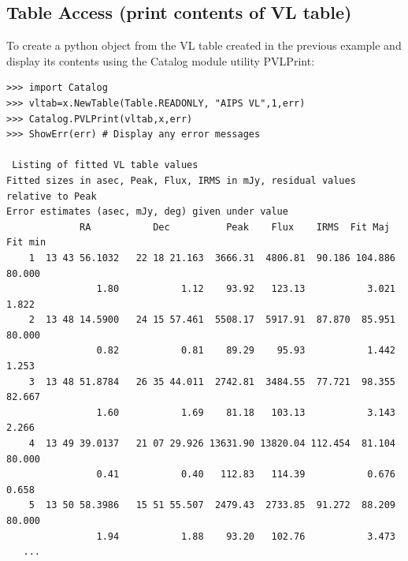 \documentclass[11pt]{report}
\begin{document}
\subsection{Table Access (print contents of VL table)}
To create a python object from the VL table created in the previous example
and display its contents using the Catalog module utility PVLPrint:
\begin{verbatim}
>>> import Catalog
>>> vltab=x.NewTable(Table.READONLY, "AIPS VL",1,err)
>>> Catalog.PVLPrint(vltab,x,err)
>>> ShowErr(err) # Display any error messages

 Listing of fitted VL table values
Fitted sizes in asec, Peak, Flux, IRMS in mJy, residual values relative to Peak
Error estimates (asec, mJy, deg) given under value
             RA           Dec          Peak    Flux    IRMS  Fit Maj Fit min 
    1  13 43 56.1032   22 18 21.163  3666.31  4806.81  90.186 104.886  80.000
                1.80           1.12    93.92   123.13           3.021   1.822
    2  13 48 14.5900   24 15 57.461  5508.17  5917.91  87.870  85.951  80.000
                0.82           0.81    89.29    95.93           1.442   1.253
    3  13 48 51.8784   26 35 44.011  2742.81  3484.55  77.721  98.355  82.667
                1.60           1.69    81.18   103.13           3.143   2.266
    4  13 49 39.0137   21 07 29.926 13631.90 13820.04 112.454  81.104  80.000
                0.41           0.40   112.83   114.39           0.676   0.658
    5  13 50 58.3986   15 51 55.507  2479.43  2733.85  91.272  88.209  80.000
                1.94           1.88    93.20   102.76           3.473
   ...
\end{verbatim}
\end{document}
